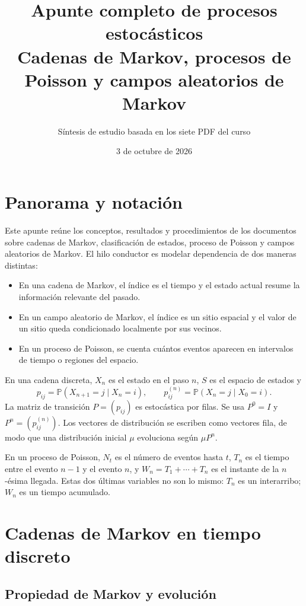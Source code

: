 \documentclass[11pt,oneside]{article}
\title{Apunte completo de procesos estocásticos\\[0.35em]
\large Cadenas de Markov, procesos de Poisson y campos aleatorios de Markov}
\author{Síntesis de estudio basada en los siete PDF del curso}
\date{3 de octubre de 2026}
\newcommand{\Prob}{\mathbb{P}}
\newcommand{\1}{\mathbf{1}}
\begin{document}
\maketitle
\tableofcontents
\newpage

\section{Panorama y notación}

Este apunte reúne los conceptos, resultados y procedimientos de los documentos sobre cadenas de Markov, clasificación de estados, proceso de Poisson y campos aleatorios de Markov. El hilo conductor es modelar dependencia de dos maneras distintas:
\begin{itemize}
  \item En una cadena de Markov, el índice es el tiempo y el estado actual resume la información relevante del pasado.
  \item En un campo aleatorio de Markov, el índice es un sitio espacial y el valor de un sitio queda condicionado localmente por sus vecinos.
  \item En un proceso de Poisson, se cuenta cuántos eventos aparecen en intervalos de tiempo o regiones del espacio.
\end{itemize}

En una cadena discreta, $X_n$ es el estado en el paso $n$, $S$ es el espacio de estados y
\[
p_{ij}=\Prob(X_{n+1}=j\mid X_n=i),\qquad
p_{ij}^{(n)}=\Prob(X_n=j\mid X_0=i).
\]
La matriz de transición $P=(p_{ij})$ es estocástica por filas. Se usa $P^0=I$ y $P^n=(p_{ij}^{(n)})$. Los vectores de distribución se escriben como vectores fila, de modo que una distribución inicial $\mu$ evoluciona según $\mu P^n$.

En un proceso de Poisson, $N_t$ es el número de eventos hasta $t$, $T_n$ es el tiempo entre el evento $n-1$ y el evento $n$, y $W_n=T_1+\cdots+T_n$ es el instante de la $n$-ésima llegada. Estas dos últimas variables no son lo mismo: $T_n$ es un interarribo; $W_n$ es un tiempo acumulado.

\section{Cadenas de Markov en tiempo discreto}

\subsection{Propiedad de Markov y evolución}
\end{document}
